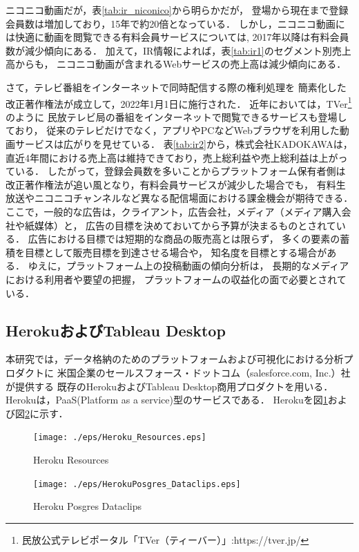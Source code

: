 \documentclass[submit,techrep,noauthor]{ipsj}
\begin{document}
ニコニコ動画だが，表\ref{tab:ir_niconico}から明らかだが，
登場から現在まで登録会員数は増加しており，15年で約20倍となっている．
%
しかし，ニコニコ動画には快適に動画を閲覧できる有料会員サービスについては,
2017年以降は有料会員数が減少傾向にある．
%
加えて，IR情報によれば，表\ref{tab:ir1}のセグメント別売上高からも，
ニコニコ動画が含まれるWebサービスの売上高は減少傾向にある．

\newpage
さて，テレビ番組をインターネットで同時配信する際の権利処理を
簡素化した改正著作権法が成立して，2022年1月1日に施行された．
%
近年においては，TVer\footnote{民放公式テレビポータル「TVer（ティーバー）」:https://tver.jp/}のように
民放テレビ局の番組をインターネットで閲覧できるサービスも登場しており，
従来のテレビだけでなく，アプリやPCなどWebブラウザを利用した動画サービスは広がりを見せている．
%
表\ref{tab:ir2}から，株式会社KADOKAWAは，
直近4年間における売上高は維持できており，売上総利益や売上総利益は上がっている．
%
したがって，登録会員数を多いことからプラットフォーム保有者側は
改正著作権法が追い風となり，有料会員サービスが減少した場合でも，
有料生放送やニコニコチャンネルなど異なる配信場面における課金機会が期待できる．
%
ここで，一般的な広告は，クライアント，広告会社，メディア（メディア購入会社や紙媒体）と，
広告の目標を決めておいてから予算が決まるものとされている\cite{dentsu_shinwa}．
%
広告における目標では短期的な商品の販売高とは限らず，
多くの要素の蓄積を目標として販売目標を到達させる場合や，
知名度を目標とする場合がある．
%
ゆえに，プラットフォーム上の投稿動画の傾向分析は，
長期的なメディアにおける利用者や要望の把握，
プラットフォームの収益化の面で必要とされている．

\subsection{HerokuおよびTableau Desktop}
本研究では，データ格納のためのプラットフォームおよび可視化における分析プロダクトに
米国企業のセールスフォース・ドットコム（salesforce.com, Inc.）社が提供する
既存のHerokuおよびTableau Desktop商用プロダクトを用いる．
Herokuは，PaaS(Platform as a service)型のサービスである．
Herokuを図\ref{fig:Heroku_Resources}および図\ref{fig:HerokuPosgres_Dataclips}に示す．

\begin{figure}[htb]
  \begin{center}
    \texttt{[image: ./eps/Heroku\_Resources.eps]}
    \caption{Heroku Resources}
    \label{fig:Heroku_Resources}
  \end{center}
\end{figure}
%
\begin{figure}[htb]
  \begin{center}
    \texttt{[image: ./eps/HerokuPosgres\_Dataclips.eps]}
    \caption{Heroku Posgres Dataclips}
    \label{fig:HerokuPosgres_Dataclips}
  \end{center}
\end{figure}
\end{document}
